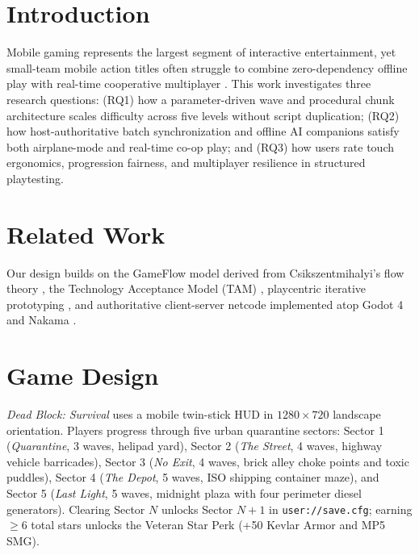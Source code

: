 \documentclass[conference]{IEEEtran}
\begin{document}
\section{Introduction}
Mobile gaming represents the largest segment of interactive entertainment, yet small-team mobile action titles often struggle to combine zero-dependency offline play with real-time cooperative multiplayer \cite{sweetser2005, davis1989}. This work investigates three research questions: (RQ1) how a parameter-driven wave and procedural chunk architecture scales difficulty across five levels without script duplication; (RQ2) how host-authoritative batch synchronization and offline AI companions satisfy both airplane-mode and real-time co-op play; and (RQ3) how users rate touch ergonomics, progression fairness, and multiplayer resilience in structured playtesting.

\section{Related Work}
Our design builds on the GameFlow model \cite{sweetser2005} derived from Csikszentmihalyi's flow theory \cite{csikszentmihalyi1990}, the Technology Acceptance Model (TAM) \cite{davis1989, heijden2004}, playcentric iterative prototyping \cite{fullerton2018, schell2019}, and authoritative client-server netcode \cite{bernier2001, fiedler2016} implemented atop Godot 4 \cite{godot2026} and Nakama \cite{nakama2026}.

\section{Game Design}
\textit{Dead Block: Survival} uses a mobile twin-stick HUD in $1280\times720$ landscape orientation. Players progress through five urban quarantine sectors: Sector 1 (\textit{Quarantine}, 3 waves, helipad yard), Sector 2 (\textit{The Street}, 4 waves, highway vehicle barricades), Sector 3 (\textit{No Exit}, 4 waves, brick alley choke points and toxic puddles), Sector 4 (\textit{The Depot}, 5 waves, ISO shipping container maze), and Sector 5 (\textit{Last Light}, 5 waves, midnight plaza with four perimeter diesel generators). Clearing Sector $N$ unlocks Sector $N+1$ in \texttt{user://save.cfg}; earning $\ge 6$ total stars unlocks the Veteran Star Perk (+50 Kevlar Armor and MP5 SMG).
\end{document}
